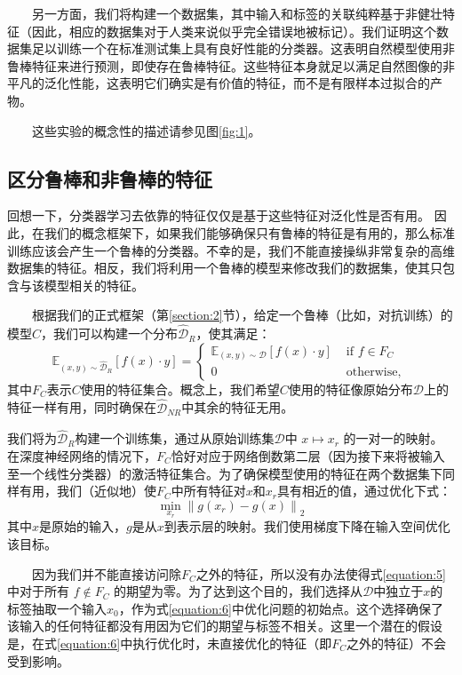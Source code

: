\documentclass{article}
\begin{document}
\ \ \ \ 另一方面，我们将构建一个数据集，其中输入和标签的关联纯粹基于非健壮特征（因此，相应的数据集对于人类来说似乎完全错误地被标记）。我们证明这个数据集足以训练一个在标准测试集上具有良好性能的分类器。这表明自然模型使用非鲁棒特征来进行预测，即使存在鲁棒特征。这些特征本身就足以满足自然图像的非平凡的泛化性能，这表明它们确实是有价值的特征，而不是有限样本过拟合的产物。

\ \ \ \ 这些实验的概念性的描述请参见图\ref{fig:1}。

\subsection{区分鲁棒和非鲁棒的特征}

回想一下，分类器学习去依靠的特征仅仅是基于这些特征对泛化性是否有用。
因此，在我们的概念框架下，如果我们能够确保只有鲁棒的特征是有用的，那么标准训练应该会产生一个鲁棒的分类器。不幸的是，我们不能直接操纵非常复杂的高维数据集的特征。相反，我们将利用一个鲁棒的模型来修改我们的数据集，使其只包含与该模型相关的特征。

\ \ \ \ 根据我们的正式框架（第\ref{section:2}节），给定一个鲁棒（比如，对抗训练）的模型$C$，我们可以构建一个分布$\widehat{\mathcal{D}}_{R}$，使其满足：
\begin{equation}
\label{equation:5}
\mathbb{E}_{(x, y) \sim \widehat{\mathcal{D}}_{R}}[f(x) \cdot y]=\left\{
  \begin{array}{ll}
    {\mathbb{E}_{(x, y) \sim \mathcal{D}}[f(x) \cdot y]} & {\text { if } f \in F_{C}} \\ {0} & {\text { otherwise, }}
  \end{array}\right.
\end{equation}
其中$F_C$表示$C$使用的特征集合。概念上，我们希望$C$使用的特征像原始分布$\mathcal{D}$上的特征一样有用，同时确保在$\widehat{\mathcal{D}}_{N R}$中其余的特征无用。

我们将为$\widehat{\mathcal{D}}_{R}$构建一个训练集，通过从原始训练集$\mathcal{D}$中 $x \mapsto x_{r}$ 的一对一的映射。在深度神经网络的情况下，$F_C$恰好对应于网络倒数第二层（因为接下来将被输入至一个线性分类器）的激活特征集合。为了确保模型使用的特征在两个数据集下同样有用，我们（近似地）使$F_C$中所有特征对$x$和$x_r$具有相近的值，通过优化下式：
\begin{equation}
\label{equation:6}
  \min _{x_{r}}\left\|g\left(x_{r}\right)-g(x)\right\|_{2}
\end{equation}
其中$x$是原始的输入，$g$是从$x$到表示层的映射。我们使用梯度下降在输入空间优化该目标。

\ \ \ \ 因为我们并不能直接访问除$F_C$之外的特征，所以没有办法使得式\eqref{equation:5}中对于所有 $f \notin F_{C}$ 的期望为零。为了达到这个目的，我们选择从$\mathcal{D}$中独立于$x$的标签抽取一个输入$x_0$，作为式\eqref{equation:6}中优化问题的初始点。这个选择确保了该输入的任何特征都没有用因为它们的期望与标签不相关。这里一个潜在的假设是，在式\eqref{equation:6}中执行优化时，未直接优化的特征（即$F_C$之外的特征）不会受到影响。
\end{document}
